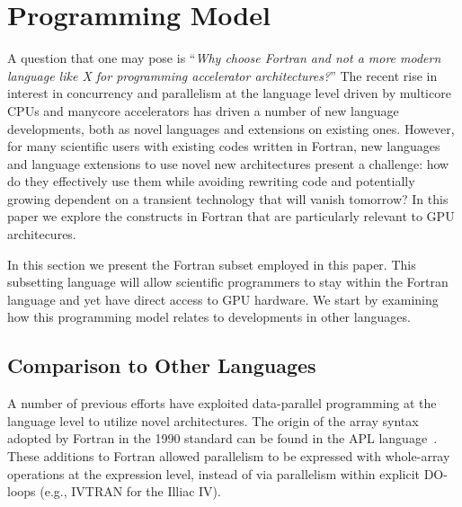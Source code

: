 \section{Programming Model}

A question that one may pose is ``\emph{Why choose Fortran and not a more modern
  language like X for programming accelerator architectures?}''  The recent rise
in interest in concurrency and parallelism at the language level driven by
multicore CPUs and manycore accelerators has driven a number of new language
developments, both as novel languages and extensions on existing ones.  However,
for many scientific users with existing codes written in Fortran, new languages
and language extensions to use novel new architectures present a challenge: how
do they effectively use them while avoiding rewriting code and potentially
growing dependent on a transient technology that will vanish tomorrow?
In this paper we explore the constructs in Fortran that are particularly
relevant to GPU architecures.

In this section we present the Fortran subset employed in this paper.  This
subsetting language will allow scientific programmers to stay within the Fortran
language and yet have direct access to GPU hardware.  We start by examining how this
programming model relates to developments in other languages.


\subsection{Comparison to Other Languages}

A number of previous efforts have exploited data-parallel programming at the
language level to utilize novel architectures.
The origin of the array syntax adopted by Fortran in the 1990
standard can be found in the APL language~\cite{iverson79apl}.  These additions
to Fortran allowed parallelism to be expressed with whole-array operations at
the expression level, instead of via parallelism within explicit DO-loops (e.g.,
IVTRAN for the Illiac IV).

